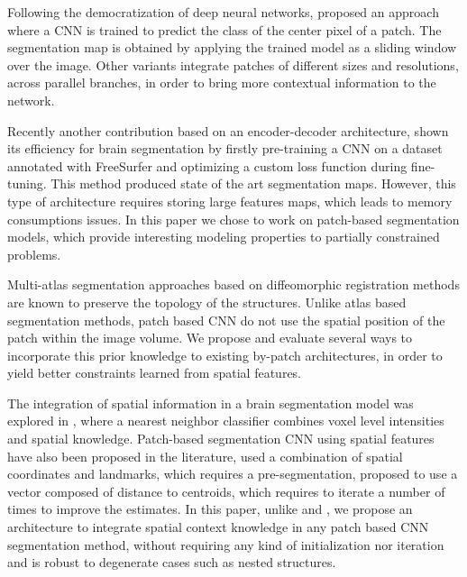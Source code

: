 \documentclass{article}
\begin{document}
Following the democratization of deep neural networks, \cite{lee} proposed an approach where a CNN is trained to predict the class of the center pixel of a patch. The segmentation map is obtained by applying the trained model as a sliding window over the image. Other variants \cite{moeskops_automatic_2016, brebisson} integrate patches of different sizes and resolutions, across parallel branches, in order to bring more contextual information to the network.

Recently another contribution based on an encoder-decoder architecture, shown its efficiency for brain segmentation \cite{DBLP:journals/corr/RoyCSKNW17} by firstly pre-training a CNN on a dataset annotated with FreeSurfer and optimizing a custom loss function during fine-tuning. This method produced state of the art segmentation maps. However, this type of architecture requires storing large features maps, which leads to memory consumptions issues. In this paper we chose to work on patch-based segmentation models, which provide interesting modeling properties to partially constrained problems.

Multi-atlas segmentation approaches \cite{HECKEMANN2006115, mindboogle, SDIK-15b, wang2013multi} based on diffeomorphic registration methods are known to preserve the topology of the structures.
Unlike atlas based segmentation methods, patch based CNN do not use the spatial position of the patch within the image volume.
We propose and evaluate several ways to incorporate this prior knowledge to existing by-patch architectures, in order to yield better constraints learned from spatial features.

The integration of spatial information in a brain segmentation model was explored in \cite{ANBEEK2005795}, where a nearest neighbor classifier combines voxel level intensities and spatial knowledge.
Patch-based segmentation CNN using spatial features have also been proposed in the literature, \cite{ghafoorian_deep_2017} used a combination of spatial coordinates and landmarks, which requires a pre-segmentation, \cite{brebisson} proposed to use a vector composed of distance to centroids, which requires to iterate a number of times to improve the estimates.
In this paper, unlike \cite{brebisson} and \cite{ghafoorian_deep_2017}, we propose an architecture to integrate spatial context knowledge in any patch based CNN segmentation method, without requiring any kind of initialization nor iteration and is robust to degenerate cases such as nested structures. \newline
\end{document}
